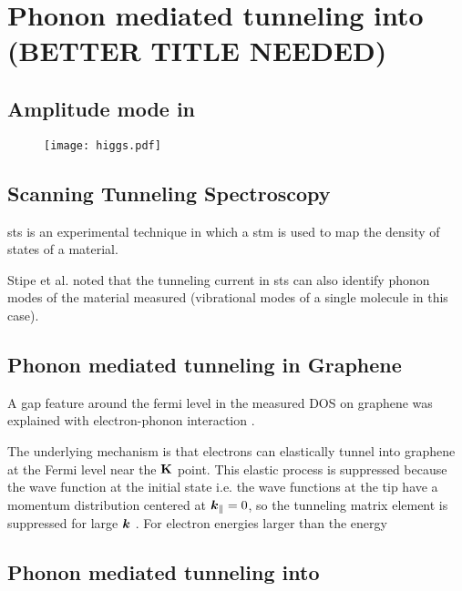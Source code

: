\documentclass[main.tex]{subfiles}
\begin{document}
\chapter{Phonon mediated tunneling into \TaS (BETTER TITLE NEEDED)}\label{ch:sts_gap_tas2}

\section{Amplitude mode in \TaS}

\begin{figure}[h!]
    \centering
    \texttt{[image: higgs.pdf]}
    \label{}
    \caption{}
\end{figure}


\section{Scanning Tunneling Spectroscopy}

\acrfull{sts} is an experimental technique in which a \acrfull{stm} is used to map the density of states of a material.


Stipe et al. noted that the tunneling current in \acrshort{sts} can also identify phonon modes of the material measured \cite{stipe_single-molecule_1998} (vibrational modes of a single molecule in this case).

\section{Phonon mediated tunneling in Graphene}

A gap feature around the fermi level in the measured DOS on graphene \cite{zhang_giant_2008} was explained with electron-phonon interaction \cite{wehling_phonon-mediated_2008}.

The underlying mechanism is that electrons can elastically tunnel into graphene at the Fermi level near the \(\vb{K}\) point. 
This elastic process is suppressed because the wave function at the initial state i.e. the wave functions at the tip have a momentum distribution centered at \(\vb*{k}_{\parallel} = 0\), so the tunneling matrix element is suppressed for large \(\vb*{k}\) \cite{vitali_phonon_2004}.
For electron energies larger than the energy 

\section{Phonon mediated tunneling into \TaS}
\end{document}
